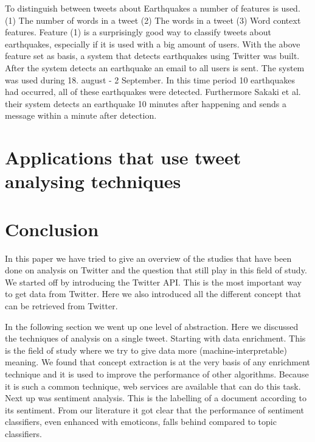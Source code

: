 \documentclass{article}
\begin{document}
To distinguish between tweets about Earthquakes a number of features is used. (1) The number of words in a tweet (2) The words in a tweet (3) Word context features. Feature (1) is a surprisingly good way to classify tweets about earthquakes, especially if it is used with a big amount of users. With the above feature set as basis, a system that detects earthquakes using Twitter was built. After the system detects an earthquake an email to all users is sent. The system was used during 18. august - 2 September. In this time period 10 earthquakes had occurred, all of these earthquakes were detected. Furthermore Sakaki et al. their system detects an earthquake 10 minutes after happening and sends a message within a minute after detection. 
\cite{earthq}

\section{Applications that use tweet analysing techniques}



\section{Conclusion}
In this paper we have tried to give an overview of the studies that have been done on analysis on Twitter and the question that still play in this field of study. We started off by introducing the Twitter API. This is the most important way to get data from Twitter. Here we also introduced all the different concept that can be retrieved from Twitter. 

In the following section we went up one level of abstraction. Here we discussed the techniques of analysis on a single tweet. Starting with data enrichment. This is the field of study where we try to give data more (machine-interpretable) meaning. We found that concept extraction is at the very basis of any enrichment technique and it is used to improve the performance of other algorithms. Because it is such a common technique, web services are available that can do this task. Next up was sentiment analysis. This is the labelling of a document according to its sentiment. From our literature it got clear that the performance of sentiment classifiers, even enhanced with emoticons, falls behind compared to topic classifiers. 
\end{document}
